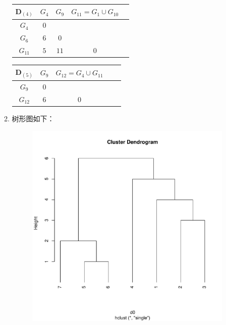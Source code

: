\begin{enumerate}
\begin{enumerate}[label=(\arabic*)]
\begin{table}[H]
\begin{tabular}{|c|c|c|c|c|}
                    \hline
                    $\pmb{D}_{(4)}$ & $G_4$ & $G_9$ & $G_{11}=G_1 \cup G_{10}$ \\ \hline
                    $G_4$ & $0$ & & \\ \hline
                    $G_6$ & $6$ & $0$ & \\ \hline
                    $G_{11}$ & $\textit{5}$ & $11$ & $0$ \\ \hline
                \end{tabular}
            \end{table}
            \begin{table}[H]
                \centering
                \begin{tabular}{|c|c|c|c|c|}
                    \hline
                    $\pmb{D}_{(5)}$ & $G_9$ & $G_{12}=G_4 \cup G_{11}$ \\ \hline
                    $G_9$ & $0$ & \\ \hline
                    $G_{12}$ & $\textit{6}$ & $0$ \\ \hline
                \end{tabular}
            \end{table}
            \item 树形图如下：
            \begin{figure}[H]
                \centering
                \includegraphics[scale=0.5]{7.3最短距离法.pdf}

\end{figure}
\end{enumerate}
\end{enumerate}
